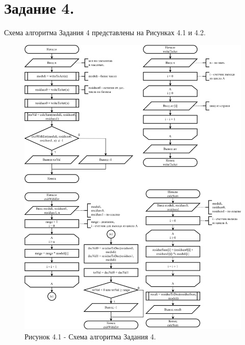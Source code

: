 \documentclass[oneside,a4paper,14pt]{extarticle} %
\begin{document}
\section*{Задание 4.}
\noindent Схема алгоритма Задания 4 представлены на Рисунках 4.1 и 4.2.
\begin{figure}[!ht]
	\centering
	\includegraphics[height=0.84\textheight]{pics/4-flowchart-p1.png}
	\caption*{Рисунок 4.1 - Схема алгоритма Задания 4.}
\end{figure}
\newpage
\end{document}
